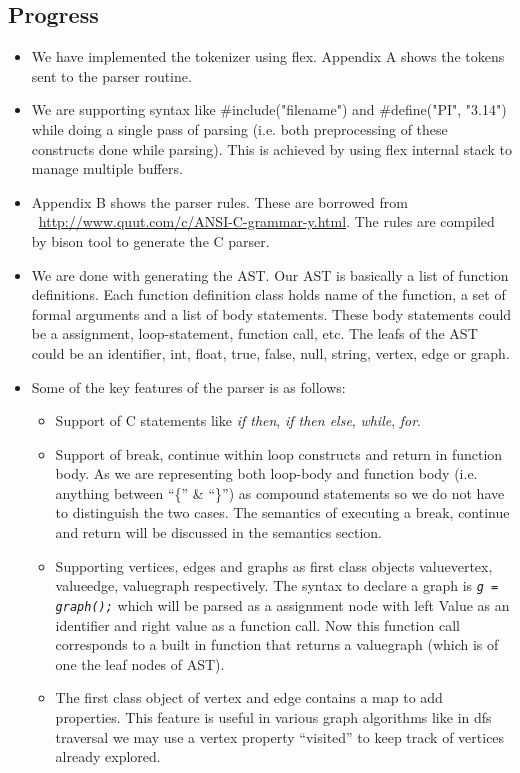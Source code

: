 \documentclass[12,twoside]{article}
\begin{document}
  \subsection{Progress}
  \begin{itemize}
    \item We have implemented the tokenizer using flex. Appendix A shows the 
      tokens sent to the parser routine.
    \item We are supporting syntax like \#include("filename") and \#define("PI", 
        "3.14") while doing a single pass of parsing  (i.e. both
    preprocessing of these constructs done while parsing). This is achieved by 
          using flex internal stack to manage multiple buffers.
    \item Appendix B shows the parser rules. These are borrowed from 
     ~\url{http://www.quut.com/c/ANSI-C-grammar-y.html}. The rules are compiled 
     by bison tool to generate the C parser.

    \item  We are done with generating the AST. Our AST is basically a list of 
    function definitions. Each function definition class holds name of the 
    function, a set of formal arguments and a list of body statements. These body 
    statements could be a assignment, loop-statement, function call, etc.
    The leafs of the AST could be an identifier, int, float, true, false, null, string, vertex, 
    edge or graph.
    \item Some of the key features of the parser is as follows:

    \begin{itemize}
      \item Support of C statements like  \emph{if then}, \emph{if then else}, 
        \emph{while}, \emph{for}. 

      \item Support of break, continue within loop constructs and return in 
      function body.
      As we are representing both loop-body and function body (i.e. anything 
          between ``\{'' \& ``\}'') as compound statements so we do not have to
      distinguish the two cases. The semantics of executing a break, continue 
      and return will be discussed in the semantics section.

      \item Supporting vertices, edges and graphs as first class objects 
      valuevertex, valueedge, valuegraph respectively.
      The syntax to declare a graph is {\tt\emph{g = graph();}} which will be 
      parsed as a assignment node with left Value as an identifier and right
      value as a function call. Now this function call corresponds to a built in 
      function that returns a valuegraph (which is of one the leaf nodes of AST).
      \item The first class object of vertex and edge contains a map to add
      properties. This feature is useful in various graph algorithms like in dfs 
      traversal we may use a vertex property ``visited'' to keep track of 
      vertices already explored.
    \end{itemize}
    
  \end{itemize}
  
\end{document}
